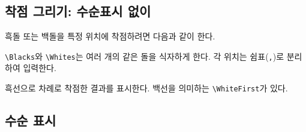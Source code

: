 \documentclass[figtabcapt,a4paper]{oblivoir}
\begin{document}
\subsection{착점 그리기: 수순표시 없이}

흑돌 또는 백돌을 특정 위치에 착점하려면 다음과 같이 한다.
\begin{boxedverbatim}
 
\end{boxedverbatim}

\begin{ksbadukpan}[badukpansize=7,badukpancolor=yellow!20][DL]
 
\end{ksbadukpan}

\begin{boxedverbatim}
 
\end{boxedverbatim}

\begin{ksbadukpan}[badukpansize=7,badukpancolor=yellow!20][DL]
\end{ksbadukpan}
\quad
\begin{ksbadukpan}[badukpansize=7,badukpancolor=yellow!20][DL]
\end{ksbadukpan}

\verb|\Blacks|와 \verb|\Whites|는 여러 개의 같은 돌을 식자하게 한다. 각 위치는
쉼표(\verb|,|)로 분리하여 입력한다.


\begin{boxedverbatim}
\end{boxedverbatim}

\begin{ksbadukpan}[badukpansize=7,badukpancolor=yellow!20][DL]
\end{ksbadukpan}

흑선으로 차례로 착점한 결과를 표시한다. 백선을 의미하는 \verb|\WhiteFirst|가 있다.

\subsection{수순 표시}

\begin{boxedverbatim}
\end{boxedverbatim}

\begin{ksbadukpan}[badukpansize=7,badukpancolor=yellow!20][DL]
\end{ksbadukpan}
\end{document}
